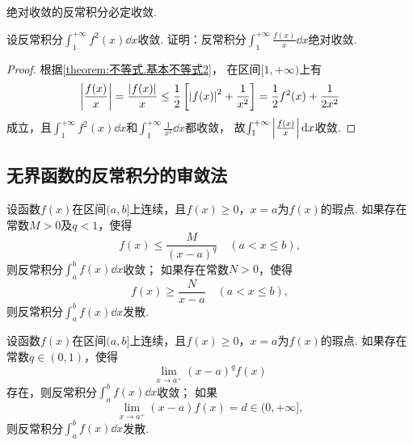 \begin{theorem}\label{theorem:定积分.绝对收敛的无穷限反常积分必收敛}
绝对收敛的反常积分必定收敛.
\end{theorem}

\begin{example}
设反常积分\(\int_1^{+\infty} f^2(x) \dd{x}\)收敛.
证明：反常积分\(\int_1^{+\infty} \frac{f(x)}{x} \dd{x}\)绝对收敛.
\begin{proof}
根据\cref{theorem:不等式.基本不等式2}，
在区间\([1,+\infty)\)上有\[
\abs{\frac{f(x)}{x}}
= \frac{\abs{f(x)}}{x}
\leq \frac{1}{2} \left[
	\abs{f(x)}^2 + \frac{1}{x^2}
\right]
= \frac{1}{2} f^2(x) + \frac{1}{2x^2}
\]成立，且\(\int_1^{+\infty} f^2(x) \dd{x}\)和\(\int_1^{+\infty} \frac{1}{x^2} \dd{x}\)都收敛，
故\(\int_1^{+\infty} \abs{\frac{f(x)}{x}} \dd{x}\)收敛.
\end{proof}
\end{example}

\subsection{无界函数的反常积分的审敛法}
\begin{theorem}[比较审敛法]\label{theorem:定积分.无界函数的反常积分的比较审敛法}
设函数\(f(x)\)在区间\((a,b]\)上连续，且\(f(x) \geq 0\)，\(x=a\)为\(f(x)\)的瑕点.
如果存在常数\(M > 0\)及\(q < 1\)，使得\[
f(x) \leq \frac{M}{(x-a)^q} \quad (a < x \leq b),
\]则反常积分\(\int_a^b f(x) \dd{x}\)收敛；
如果存在常数\(N > 0\)，使得\[
f(x) \geq \frac{N}{x - a} \quad (a < x \leq b),
\]则反常积分\(\int_a^b f(x) \dd{x}\)发散.
\end{theorem}

\begin{theorem}[极限审敛法]\label{theorem:定积分.无界函数的反常积分的极限审敛法}
设函数\(f(x)\)在区间\((a,b]\)上连续，且\(f(x) \geq 0\)，\(x=a\)为\(f(x)\)的瑕点.
如果存在常数\(q \in (0,1)\)，使得\[
\lim_{x \to a^+} (x-a)^q f(x)
\]存在，则反常积分\(\int_a^b f(x) \dd{x}\)收敛；
如果\[
\lim_{x \to a^+} (x-a) f(x) = d \in (0,+\infty],
\]则反常积分\(\int_a^b f(x) \dd{x}\)发散.
\end{theorem}
